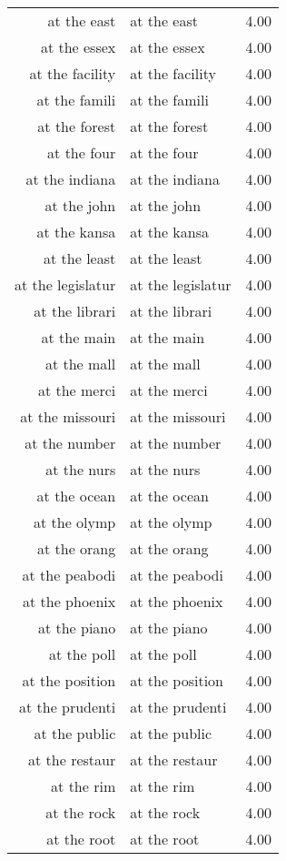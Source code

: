 \begin{table}[ht]
\begin{tabular}{rlr}
  at the east & at the east & 4.00 \\ 
  at the essex & at the essex & 4.00 \\ 
  at the facility & at the facility & 4.00 \\ 
  at the famili & at the famili & 4.00 \\ 
  at the forest & at the forest & 4.00 \\ 
  at the four & at the four & 4.00 \\ 
  at the indiana & at the indiana & 4.00 \\ 
  at the john & at the john & 4.00 \\ 
  at the kansa & at the kansa & 4.00 \\ 
  at the least & at the least & 4.00 \\ 
  at the legislatur & at the legislatur & 4.00 \\ 
  at the librari & at the librari & 4.00 \\ 
  at the main & at the main & 4.00 \\ 
  at the mall & at the mall & 4.00 \\ 
  at the merci & at the merci & 4.00 \\ 
  at the missouri & at the missouri & 4.00 \\ 
  at the number & at the number & 4.00 \\ 
  at the nurs & at the nurs & 4.00 \\ 
  at the ocean & at the ocean & 4.00 \\ 
  at the olymp & at the olymp & 4.00 \\ 
  at the orang & at the orang & 4.00 \\ 
  at the peabodi & at the peabodi & 4.00 \\ 
  at the phoenix & at the phoenix & 4.00 \\ 
  at the piano & at the piano & 4.00 \\ 
  at the poll & at the poll & 4.00 \\ 
  at the position & at the position & 4.00 \\ 
  at the prudenti & at the prudenti & 4.00 \\ 
  at the public & at the public & 4.00 \\ 
  at the restaur & at the restaur & 4.00 \\ 
  at the rim & at the rim & 4.00 \\ 
  at the rock & at the rock & 4.00 \\ 
  at the root & at the root & 4.00 \\ 

\end{tabular}
\end{table}
